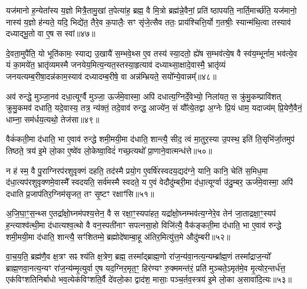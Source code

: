 यज॑मानो ह॒न्येता᳚स्य य॒ज्ञो मित्रै॒तामु॒खां त॒पेत्या॑ह॒ ब्रह्म॒ वै मि॒त्रो ब्रह्म॑न्ने॒वैनां॒ प्रति॑ ष्ठापयति॒ नार्ति॒मार्च्छ॑ति॒ यज॑मानो॒ नास्य॑ य॒ज्ञो ह॑न्यते॒ यदि॒ भिद्ये॑त॒ तैरे॒व क॒पालैः॒ सꣳ सृ॑जे॒त्सैव ततः॒ प्राय॑श्चित्ति॒र्यो ग॒तश्रीः॒ स्यान्म॑थि॒त्वा तस्याव॑ दध्याद्भू॒तो वा ए॒ष स स्वां॥४७॥

दे॒वता॒मुपै॑ति॒ यो भूति॑कामः॒ स्याद्य उ॒खायै॑ स॒म्भवे॒थ्स ए॒व तस्य॑ स्या॒दतो॒ ह्ये॑ष स॒म्भव॑त्ये॒ष वै स्व॑य॒म्भूर्नाम॒ भव॑त्ये॒व यं का॒मये॑त॒ भ्रातृ॑व्यमस्मै जनयेय॒मित्य॒न्यत॒स्तस्या॒हृत्याव॑ दध्याथ्सा॒क्षादे॒वास्मै॒ भ्रातृ॑व्यं जनयत्यम्ब॒रीषा॒\-दन्न॑काम॒स्याव॑ दध्यादम्ब॒रीषे॒ वा अन्न॑म्भ्रियते॒ सयो᳚न्ये॒वान्नम्᳚॥४८॥

अव॑ रुन्द्धे॒ मुञ्जा॒नव॑ दधा॒त्यूर्ग्वै मुञ्जा॒ ऊर्ज॑मे॒वास्मा॒ अपि॑ दधात्य॒ग्निर्दे॒वेभ्यो॒ निला॑यत॒ स क्रु॑मु॒कम्प्रावि॑शत् क्रुमु॒कमव॑ दधाति॒ यदे॒वास्य॒ तत्र॒ न्य॑क्तं॒ तदे॒वाव॑ रुन्द्ध॒ आज्ये॑न॒ सं यौ᳚त्ये॒तद्वा अ॒ग्नेः प्रि॒यं धाम॒ यदाज्य॑म् प्रि॒येणै॒वैनं॒ धाम्ना॒ सम॑र्धय॒त्यथो॒ तेज॑सा॥४९॥

वैकं॑कती॒मा द॑धाति॒ भा ए॒वाव॑ रुन्द्धे शमी॒मयी॒मा द॑धाति॒ शान्त्यै॒ सीद॒ त्वं मा॒तुर॒स्या उ॒पस्थ॒ इति॑ ति॒सृभि॑र्जा॒तमुप॑ तिष्ठते॒ त्रय॑ इ॒मे लो॒का ए॒ष्वे॑व लो॒केष्वा॒विदं॑ गच्छ॒त्यथो᳚ प्रा॒णाने॒वात्मन्ध॑त्ते॥५०॥

{}

न ह॑ स्म॒ वै पु॒राग्निरप॑रशुवृक्णं दहति॒ तद॑स्मै प्रयो॒ग ए॒वर्\mbox{}षि॑रस्वदय॒द्यद॑ग्ने॒ यानि॒ कानि॒ चेति॑ स॒मिध॒मा द॑धा॒त्यप॑रशुवृक्णमे॒वास्मै᳚ स्वदयति॒ सर्व॑मस्मै स्वदते॒ य ए॒वं वेदौदु॑म्बरी॒मा द॑धा॒त्यूर्ग्वा उ॑दु॒म्बर॒ ऊर्ज॑मे॒वास्मा॒ अपि॑ दधाति प्र॒जाप॑तिर॒ग्निम॑सृजत॒ तꣳ सृ॒ष्टꣳ रक्षाꣳ॑सि॥५१॥

अ॒जि॒घा॒ꣳ॒स॒न्थ्स ए॒तद्रा᳚क्षो॒घ्नम॑पश्य॒त्तेन॒ वै स रक्षा॒ꣳ॒स्यपा॑हत॒ यद्रा᳚क्षो॒घ्नम्भव॑त्य॒ग्नेरे॒व तेन॑ जा॒ताद्रक्षा॒ꣳ॒स्यप॑ ह॒न्त्याश्व॑त्थी॒मा द॑धात्यश्व॒त्थो वै वन॒स्पती॑नाꣳ सपत्नसा॒हो विजि॑त्यै॒ वैक॑ङ्कती॒मा द॑धाति॒ भा ए॒वाव॑ रुन्द्धे शमी॒मयी॒मा द॑धाति॒ शान्त्यै॒ सꣳ॑शितम्मे॒ ब्रह्मोदे॑षाम्बा॒हू अ॑तिर॒मित्यु॑त्त॒मे औदु॑म्बरी॥५२॥

वा॒च॒य॒ति॒ ब्रह्म॑णै॒व क्ष॒त्रꣳ सꣴ श्य॑ति क्ष॒त्रेण॒ ब्रह्म॒ तस्मा᳚द्ब्राह्म॒णो रा॑ज॒न्य॑वा॒नत्य॒न्यम्ब्रा᳚ह्म॒णं तस्मा᳚द्राज॒न्यो᳚ ब्राह्म॒णवा॒नत्य॒न्यꣳ रा॑ज॒न्य॑म्मृ॒त्युर्वा ए॒ष यद॒ग्निर॒मृत॒ꣳ॒ हिर॑ण्यꣳ रु॒क्ममन्त॑रं॒ प्रति॑ मुञ्चते॒\-ऽमृत॑मे॒व मृ॒त्योर॒न्तर्ध॑त्त॒ एक॑विꣳशतिनिर्बाधो भव॒त्येक॑विꣳशति॒र्वै दे॑वलो॒का द्वाद॑श॒ मासाः॒ पञ्च॒र्तव॒स्त्रय॑ इ॒मे लो॒का अ॒सावा॑दि॒त्यः॥५३॥

